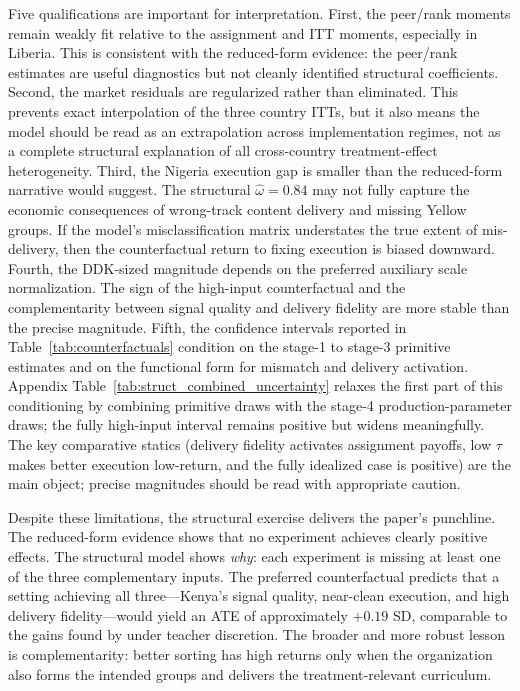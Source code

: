 \documentclass[11pt]{article}
\begin{document}
Five qualifications are important for interpretation. First, the peer/rank moments remain weakly fit relative to the assignment and ITT moments, especially in Liberia. This is consistent with the reduced-form evidence: the peer/rank estimates are useful diagnostics but not cleanly identified structural coefficients. Second, the market residuals are regularized rather than eliminated. This prevents exact interpolation of the three country ITTs, but it also means the model should be read as an extrapolation across implementation regimes, not as a complete structural explanation of all cross-country treatment-effect heterogeneity. Third, the Nigeria execution gap is smaller than the reduced-form narrative would suggest. The structural $\hat{\omega} = 0.84$ may not fully capture the economic consequences of wrong-track content delivery and missing Yellow groups. If the model's misclassification matrix understates the true extent of mis-delivery, then the counterfactual return to fixing execution is biased downward. Fourth, the DDK-sized magnitude depends on the preferred auxiliary scale normalization. The sign of the high-input counterfactual and the complementarity between signal quality and delivery fidelity are more stable than the precise magnitude. Fifth, the confidence intervals reported in Table~\ref{tab:counterfactuals} condition on the stage-1 to stage-3 primitive estimates and on the functional form for mismatch and delivery activation. Appendix Table~\ref{tab:struct_combined_uncertainty} relaxes the first part of this conditioning by combining primitive draws with the stage-4 production-parameter draws; the fully high-input interval remains positive but widens meaningfully. The key comparative statics (delivery fidelity activates assignment payoffs, low $\tau$ makes better execution low-return, and the fully idealized case is positive) are the main object; precise magnitudes should be read with appropriate caution.

Despite these limitations, the structural exercise delivers the paper's punchline. The reduced-form evidence shows that no experiment achieves clearly positive effects. The structural model shows \emph{why}: each experiment is missing at least one of the three complementary inputs. The preferred counterfactual predicts that a setting achieving all three---Kenya's signal quality, near-clean execution, and high delivery fidelity---would yield an ATE of approximately $+0.19$ SD, comparable to the gains found by \citet{duflo2011peer} under teacher discretion. The broader and more robust lesson is complementarity: better sorting has high returns only when the organization also forms the intended groups and delivers the treatment-relevant curriculum.
\end{document}
